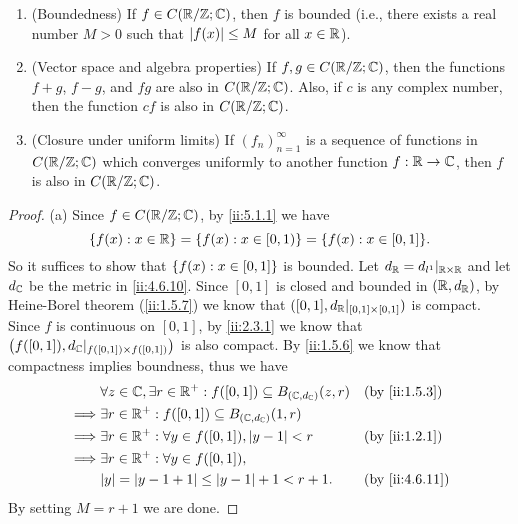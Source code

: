 \begin{lem}\label{ii:5.1.5}
  \quad
  \begin{enumerate}
    \item (Boundedness)
          If \(f \in C(\mathbb{R} / \mathbb{Z} ; \mathbb{C})\), then \(f\) is bounded
          (i.e., there exists a real number \(M > 0\) such that \(\left\lvert f(x)\right\rvert \leq M\) for all \(x \in \mathbb{R}\)).
    \item (Vector space and algebra properties)
          If \(f, g \in C(\mathbb{R} / \mathbb{Z} ; \mathbb{C})\), then the functions \(f + g\), \(f - g\), and \(f g\) are also in \(C(\mathbb{R} / \mathbb{Z} ; \mathbb{C})\).
          Also, if \(c\) is any complex number, then the function \(cf\) is also in \(C(\mathbb{R} / \mathbb{Z} ; \mathbb{C})\).
    \item (Closure under uniform limits)
          If \((f_n)_{n = 1}^\infty\) is a sequence of functions in \(C(\mathbb{R} / \mathbb{Z} ; \mathbb{C})\) which converges uniformly to another function \(f : \mathbb{R} \to \mathbb{C}\), then \(f\) is also in \(C(\mathbb{R} / \mathbb{Z} ; \mathbb{C})\).
  \end{enumerate}
\end{lem}

\begin{proof}{(a)}
  Since \(f \in C(\mathbb{R} / \mathbb{Z} ; \mathbb{C})\), by \cref{ii:5.1.1} we have
  \[
    \set{f(x) : x \in \R} = \set{f(x) : x \in [0, 1)} = \set{f(x) : x \in [0, 1]}.
  \]
  So it suffices to show that \(\left\lbrace f(x) : x \in [0, 1]\right\rbrace\) is bounded.
  Let \(d_{\mathbb{R}} = d_{l^1}|_{\mathbb{R} \times \mathbb{R}}\) and let \(d_{\mathbb{C}}\) be the metric in \cref{ii:4.6.10}.
  Since \([0, 1]\) is closed and bounded in \((\mathbb{R}, d_{\mathbb{R}})\), by Heine-Borel theorem (\cref{ii:1.5.7}) we know that \(([0, 1], d_{\mathbb{R}}|_{[0, 1] \times [0, 1]})\) is compact.
  Since \(f\) is continuous on \([0, 1]\), by \cref{ii:2.3.1} we know that \(\big(f([0, 1]), d_{\mathbb{C}}|_{f([0, 1]) \times f([0, 1])}\big)\) is also compact.
  By \cref{ii:1.5.6} we know that compactness implies boundness, thus we have
  \begin{align*}
             & \forall z \in \C, \exists r \in \R^+ : f([0, 1]) \subseteq B_{(\C, d_{\C})}(z, r) &  & \by{ii:1.5.3}  \\
    \implies & \exists r \in \R^+ : f([0, 1]) \subseteq B_{(\C, d_{\C})}(1, r)                                       \\
    \implies & \exists r \in \R^+ : \forall y \in f([0, 1]), \abs{y - 1} < r                     &  & \by{ii:1.2.1}  \\
    \implies & \exists r \in \R^+ : \forall y \in f([0, 1]),                                                         \\
             & \abs{y} = \abs{y - 1 + 1} \leq \abs{y - 1} + 1 < r + 1.                           &  & \by{ii:4.6.11}
  \end{align*}
  By setting \(M = r + 1\) we are done.
\end{proof}

